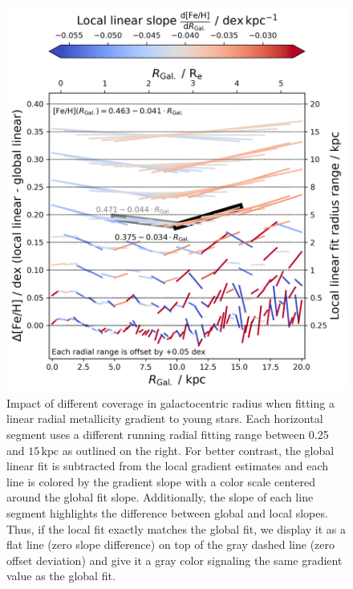 \documentclass[twocolumn,apj,numberedappendix,appendixfloats,twocolappendix]{openjournal}
\begin{document}
\begin{CJK*}{UTF8}{gbsn}
\begin{figure}
    \centering
    \includegraphics[width=\columnwidth]{figures/radial_range_impact.png}
    \caption{Impact of different coverage in galactocentric radius when fitting a linear radial metallicity gradient to young stars. Each horizontal segment uses a different running radial fitting range between 0.25 and $15\,\mathrm{kpc}$ as outlined on the right. For better contrast, the global linear fit is subtracted from the local gradient estimates and each line is colored by the gradient slope with a color scale centered around the global fit slope. Additionally, the slope of each line segment highlights the difference between global and local slopes. Thus, if the local fit exactly matches the global fit, we display it as a flat line (zero slope difference) on top of the gray dashed line (zero offset deviation) and give it a gray color signaling the same gradient value as the global fit.}
    \label{fig:radial_range_impact}
\end{figure}


\end{CJK*}
\end{document}

